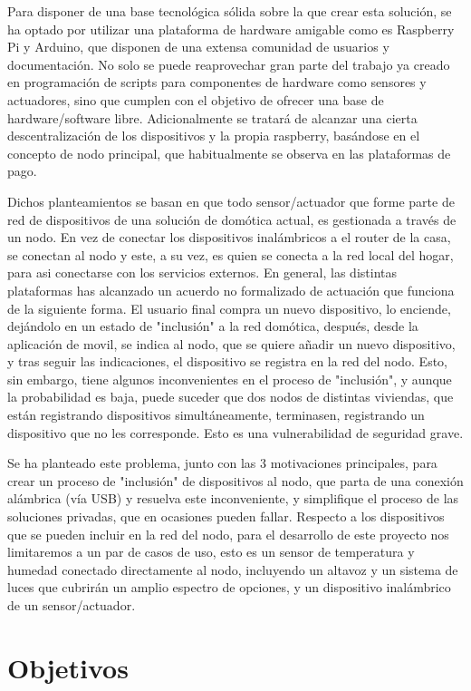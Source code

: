 Para disponer de una base tecnológica sólida sobre la que crear esta solución, se ha optado por utilizar una plataforma de hardware amigable como es Raspberry Pi y Arduino, que disponen de una extensa comunidad de usuarios y documentación. No solo se puede reaprovechar gran parte del trabajo ya creado en programación de scripts para componentes de hardware como sensores y actuadores, sino que cumplen con el objetivo de ofrecer una base de hardware/software libre. Adicionalmente se tratará de alcanzar una cierta descentralización de los dispositivos y la propia raspberry, basándose en el concepto de nodo principal, que habitualmente se observa en las plataformas de pago.

Dichos planteamientos se basan en que todo sensor/actuador que forme parte de red de dispositivos de una solución de domótica actual, es gestionada a través de un nodo. En vez de conectar los dispositivos inalámbricos a el router de la casa, se conectan al nodo y este, a su vez, es quien se conecta a la red local del hogar, para asi conectarse con los servicios externos. En general, las distintas plataformas has alcanzado un acuerdo no formalizado de actuación que funciona de la siguiente forma. El usuario final compra un nuevo dispositivo, lo enciende, dejándolo en un estado de "inclusión" a la red domótica, después, desde la aplicación de movil, se indica al nodo, que se quiere añadir un nuevo dispositivo, y tras seguir las indicaciones, el dispositivo se registra en la red del nodo. Esto, sin embargo, tiene algunos inconvenientes en el proceso de "inclusión", y aunque la probabilidad es baja, puede suceder que dos nodos de distintas viviendas, que están registrando dispositivos simultáneamente, terminasen, registrando un dispositivo que no les corresponde. Esto es una vulnerabilidad de seguridad grave.

Se ha planteado este problema, junto con las 3 motivaciones principales, para crear un proceso de "inclusión" de dispositivos al nodo, que parta de una conexión alámbrica (vía USB) y resuelva este inconveniente, y simplifique el proceso de las soluciones privadas, que en ocasiones pueden fallar. Respecto a los dispositivos que se pueden incluir en la red del nodo, para el desarrollo de este proyecto nos limitaremos a un par de casos de uso, esto es un sensor de temperatura y humedad conectado directamente al nodo, incluyendo un altavoz y un sistema de luces que cubrirán un amplio espectro de opciones, y un dispositivo inalámbrico de un sensor/actuador.


\section{Objetivos}
\label{ch:Capitulo1.2}

